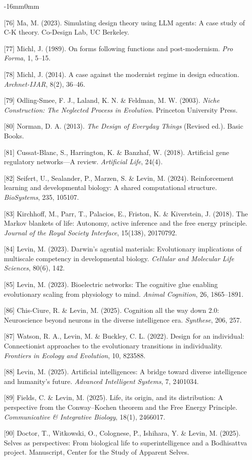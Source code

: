\documentclass[10pt,oneside]{book}
\newcommand{\refentry}[1]{%
  \par\addvspace{0pt}%
  \begingroup\footnotesize\linespread{0.92}\selectfont
  \noindent\hangindent=4mm\hangafter=1 #1\par%
  \endgroup
}
\newenvironment{widebody}{%
  \begin{adjustwidth}{-16mm}{0mm}%
}{%
  \end{adjustwidth}%
}
\begin{document}
\begin{widebody}
\refentry{[76] Ma, M. (2023). Simulating design theory using LLM agents: A case study of C-K theory. Co-Design Lab, UC Berkeley.}
\refentry{[77] Michl, J. (1989). On forms following functions and post-modernism. \textit{Pro Forma}, 1, 5--15.}
\refentry{[78] Michl, J. (2014). A case against the modernist regime in design education. \textit{Archnet-IJAR}, 8(2), 36--46.}
\refentry{[79] Odling-Smee, F. J., Laland, K. N. \& Feldman, M. W. (2003). \textit{Niche Construction: The Neglected Process in Evolution}. Princeton University Press.}
\refentry{[80] Norman, D. A. (2013). \textit{The Design of Everyday Things} (Revised ed.). Basic Books.}
\refentry{[81] Cussat-Blanc, S., Harrington, K. \& Banzhaf, W. (2018). Artificial gene regulatory networks---A review. \textit{Artificial Life}, 24(4).}
\refentry{[82] Seifert, U., Sealander, P., Marzen, S. \& Levin, M. (2024). Reinforcement learning and developmental biology: A shared computational structure. \textit{BioSystems}, 235, 105107.}
\refentry{[83] Kirchhoff, M., Parr, T., Palacios, E., Friston, K. \& Kiverstein, J. (2018). The Markov blankets of life: Autonomy, active inference and the free energy principle. \textit{Journal of the Royal Society Interface}, 15(138), 20170792.}
\refentry{[84] Levin, M. (2023). Darwin's agential materials: Evolutionary implications of multiscale competency in developmental biology. \textit{Cellular and Molecular Life Sciences}, 80(6), 142.}
\refentry{[85] Levin, M. (2023). Bioelectric networks: The cognitive glue enabling evolutionary scaling from physiology to mind. \textit{Animal Cognition}, 26, 1865--1891.}
\refentry{[86] Chis-Ciure, R. \& Levin, M. (2025). Cognition all the way down 2.0: Neuroscience beyond neurons in the diverse intelligence era. \textit{Synthese}, 206, 257.}
\refentry{[87] Watson, R. A., Levin, M. \& Buckley, C. L. (2022). Design for an individual: Connectionist approaches to the evolutionary transitions in individuality. \textit{Frontiers in Ecology and Evolution}, 10, 823588.}
\refentry{[88] Levin, M. (2025). Artificial intelligences: A bridge toward diverse intelligence and humanity's future. \textit{Advanced Intelligent Systems}, 7, 2401034.}
\refentry{[89] Fields, C. \& Levin, M. (2025). Life, its origin, and its distribution: A perspective from the Conway--Kochen theorem and the Free Energy Principle. \textit{Communicative \& Integrative Biology}, 18(1), 2466017.}
\refentry{[90] Doctor, T., Witkowski, O., Colognese, P., Ishihara, Y. \& Levin, M. (2025). Selves as perspectives: From biological life to superintelligence and a Bodhisattva project. Manuscript, Center for the Study of Apparent Selves.}

\end{widebody}
\end{document}
